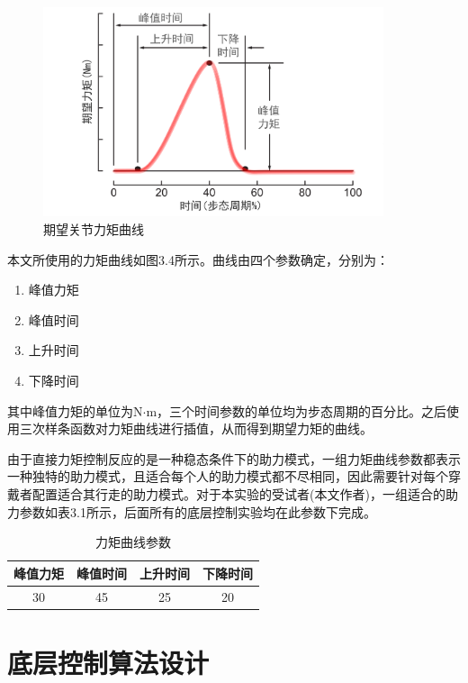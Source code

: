 \begin{figure}[htb]
    \includegraphics[width=10cm]{fig/f51.png}
    \caption{期望关节力矩曲线}
    \label{fig:mark}
\end{figure}

本文所使用的力矩曲线如图3.4所示。曲线由四个参数确定，分别为：
\begin{enumerate}
    \item 峰值力矩
    \item 峰值时间
    \item 上升时间
    \item 下降时间
\end{enumerate}
其中峰值力矩的单位为N$\cdot$m，三个时间参数的单位均为步态周期的百分比。之后使用三次样条函数对力矩曲线进行插值，从而得到期望力矩的曲线。

由于直接力矩控制反应的是一种稳态条件下的助力模式，一组力矩曲线参数都表示一种独特的助力模式，且适合每个人的助力模式都不尽相同，因此需要针对每个穿戴者配置适合其行走的助力模式。对于本实验的受试者(本文作者)，一组适合的助力参数如表3.1所示，后面所有的底层控制实验均在此参数下完成。

\begin{table}[htb]
    \caption[力矩曲线]{力矩曲线参数}
    \begin{tabular}{cccc}
      \toprule
        峰值力矩 & 峰值时间 & 上升时间 & 下降时间 \\
      \midrule
        30 & 45 & 25 & 20 \\
      \bottomrule
    \end{tabular}
\end{table}

\section{底层控制算法设计}
                                                                                        
